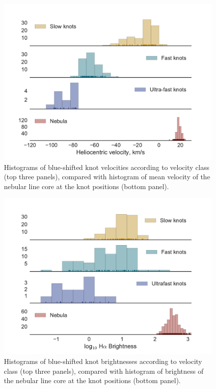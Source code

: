 \documentclass[usenatbib]{mnras}
\begin{document}
\begin{figure}
  \centering
  \includegraphics[width=\linewidth]{knot-histogram-vel}
  \caption{Histograms of blue-shifted knot velocities according to
    velocity class (top three panels), compared with histogram of mean
    velocity of the nebular line core at the knot positions (bottom
    panel).}
  \label{fig:histogram-velocity}
\end{figure}

\begin{figure}
  \centering
  \includegraphics[width=\linewidth]{knot-histogram-bright}
  \caption{Histograms of blue-shifted knot \ha{} brightnesses
    according to velocity class (top three panels), compared with
    histogram of \ha{} brightness of the nebular line core at the knot
    positions (bottom panel).}
  \label{fig:histogram-brightness}
\end{figure}
\end{document}
